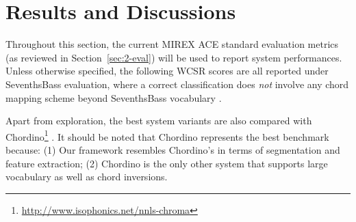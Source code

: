 \section{Results and Discussions} \label{sec:3-res}




Throughout this section, the current MIREX ACE standard evaluation metrics (as reviewed in Section~\ref{sec:2-eval}) will be used to report system performances. Unless otherwise specified, the following WCSR scores are all reported under SeventhsBass evaluation, where a correct classification does {\it not} involve any chord mapping scheme beyond SeventhsBass vocabulary \cite{pauwels2013evaluating,burgoyne2014comparative}.

Apart from exploration, the best system variants are also compared with Chordino\footnote{\url{http://www.isophonics.net/nnls-chroma}} \cite{cannam2010sonic}. It should be noted that Chordino represents the best benchmark because: (1) Our framework resembles Chordino's in terms of segmentation and feature extraction; (2) Chordino is the only other system that supports large vocabulary as well as chord inversions.

